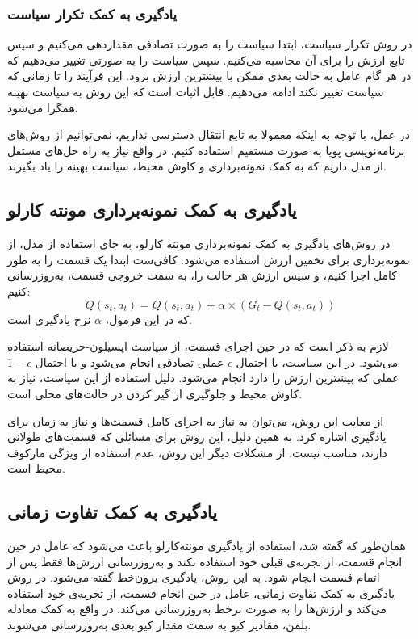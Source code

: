 \subsubsection{یادگیری به کمک تکرار سیاست}
در روش تکرار سیاست،
ابتدا سیاست را به صورت تصادفی مقداردهی می‌کنیم و سپس تابع ارزش را برای آن محاسبه می‌کنیم.
سپس سیاست را به صورتی تغییر می‌دهیم که در هر گام عامل به حالت بعدی ممکن با بیشترین ارزش برود.
این فرآیند را تا زمانی که سیاست تغییر نکند ادامه می‌دهیم.
قابل اثبات است که این روش به سیاست بهینه همگرا می‌شود.

در عمل، با توجه به اینکه معمولا به تابع انتقال دسترسی نداریم، نمی‌توانیم از روش‌های برنامه‌نویسی پویا به صورت مستقیم استفاده کنیم.
در واقع نیاز به راه حل‌های مستقل از مدل داریم که به کمک نمونه‌برداری
 و کاوش
 محیط، سیاست بهینه را یاد بگیرند.

\subsection{یادگیری به کمک نمونه‌برداری مونته کارلو}
در روش‌های یادگیری به کمک نمونه‌برداری مونته کارلو،
به جای استفاده از مدل، از نمونه‌برداری برای تخمین ارزش استفاده می‌شود\cite{barto2021reinforcement}.
کافی‌ست ابتدا یک قسمت را به طور کامل اجرا کنیم، و سپس ارزش هر حالت را، به سمت خروجی قسمت، به‌روز‌رسانی کنیم:
\begin{equation}\label{eq:mc_q_function}
    Q(s_t, a_t) = Q(s_t, a_t) + \alpha \times (G_t - Q(s_t, a_t))
\end{equation}
که در این فرمول، $\alpha$
نرخ یادگیری است.

لازم به ذکر است که در حین اجرای قسمت، از سیاست اپسیلون-حریصانه استفاده می‌شود.
در این سیاست، با احتمال $\epsilon$ عملی تصادفی انجام می‌شود و با احتمال $1-\epsilon$ عملی که بیشترین ارزش را دارد انجام می‌شود.
دلیل استفاده از این سیاست، نیاز به کاوش محیط و جلوگیری از گیر کردن در حالت‌های محلی است.

از معایب این روش، می‌توان به نیاز به اجرای کامل قسمت‌ها و نیاز به زمان برای یادگیری اشاره کرد. به همین دلیل، این روش برای مسائلی که قسمت‌های طولانی دارند، مناسب نیست.
از مشکلات دیگر این روش، عدم استفاده از ویژگی مارکوف محیط است.
\subsection{یادگیری به کمک تفاوت زمانی}
همان‌طور که گفته شد، استفاده از یادگیری مونته‌کارلو باعث می‌شود که عامل در حین انجام قسمت، از تجربه‌ی قبلی خود استفاده نکند
و به‌روز‌رسانی ارزش‌ها فقط پس از اتمام قسمت انجام شود. به این روش، یادگیری برون‌خط گفته می‌شود.
در روش یادگیری به کمک تفاوت زمانی\cite{sutton1988learning}،
عامل در حین انجام قسمت، از تجربه‌ی خود استفاده می‌کند و ارزش‌ها را به صورت برخط
 به‌روز‌رسانی می‌کند.
در واقع به کمک معادله بلمن، مقادیر کیو به سمت مقدار کیو بعدی به‌روز‌رسانی می‌شوند.

